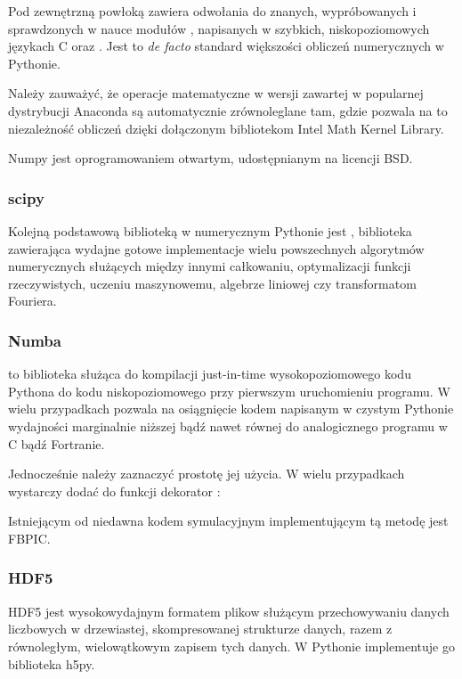 Pod zewnętrzną powłoką zawiera odwołania do znanych, wypróbowanych i
sprawdzonych w nauce modułów ,  napisanych w
szybkich, niskopoziomowych językach C oraz .  Jest to
\emph{de facto} standard większości obliczeń numerycznych w Pythonie.

Należy zauważyć, że operacje matematyczne w wersji  zawartej
w popularnej dystrybucji Anaconda są automatycznie zrównoleglane tam, gdzie
pozwala na to niezależność obliczeń dzięki dołączonym bibliotekom Intel Math
Kernel Library.\cite{intel-mkl} 

Numpy jest oprogramowaniem otwartym, udostępnianym na licencji BSD\@.


\subsubsection{scipy}
Kolejną podstawową biblioteką w numerycznym Pythonie jest \cite{scipy},
biblioteka zawierająca wydajne gotowe implementacje wielu powszechnych algorytmów
numerycznych służących między innymi całkowaniu, optymalizacji funkcji rzeczywistych,
uczeniu maszynowemu, algebrze liniowej czy transformatom Fouriera.

\subsubsection{Numba}
 to biblioteka służąca do kompilacji just-in-time wysokopoziomowego
kodu Pythona do kodu niskopoziomowego przy pierwszym uruchomieniu programu. W
wielu przypadkach pozwala na osiągnięcie kodem napisanym w czystym Pythonie
wydajności marginalnie niższej bądź nawet równej do analogicznego programu w C
bądź Fortranie.~\cite{numba}

Jednocześnie należy zaznaczyć prostotę jej użycia. W wielu przypadkach wystarczy
dodać do funkcji dekorator :



Istniejącym od niedawna kodem symulacyjnym implementującym tą metodę jest FBPIC\cite{fbpic}.


\subsubsection{HDF5}
HDF5 jest wysokowydajnym formatem plikow służącym przechowywaniu danych
liczbowych w drzewiastej, skompresowanej strukturze danych, razem z
równoległym, wielowątkowym zapisem tych danych.  W Pythonie implementuje go
biblioteka h5py\cite{h5py}.

